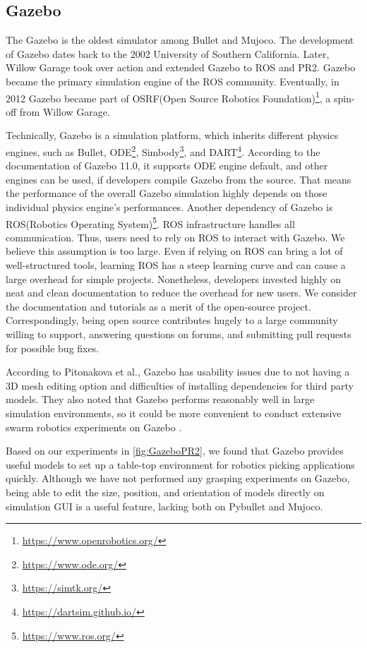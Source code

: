 \subsection{Gazebo}

The Gazebo is the oldest simulator among Bullet and Mujoco. The development of Gazebo dates back to the 2002 University of Southern California. Later, Willow Garage took over action and extended Gazebo to ROS and PR2. Gazebo became the primary simulation engine of the ROS community. Eventually, in 2012 Gazebo became part of OSRF(Open Source Robotics Foundation)\footnote{\url{https://www.openrobotics.org/}}, a spin-off from Willow Garage.

Technically, Gazebo is a simulation platform, which inherits different physics engines, such as Bullet, ODE\footnote{\url{https://www.ode.org/}}, Simbody\footnote{\url{https://simtk.org/}}, and DART\footnote{\url{https://dartsim.github.io/}}. According to the documentation of Gazebo 11.0, it supports ODE engine default, and other engines can be used, if developers compile Gazebo from the source. That means the performance of the overall Gazebo simulation highly depends on those individual physics engine’s performances.  Another dependency of Gazebo is ROS(Robotics Operating System)\footnote{\url{https://www.ros.org/}}. ROS infrastructure handles all communication. Thus, users need to rely on ROS to interact with Gazebo. We believe this assumption is too large. Even if relying on ROS can bring a lot of well-structured tools, learning ROS has a steep learning curve and can cause a large overhead for simple projects.
Nonetheless, developers invested highly on neat and clean documentation to reduce the overhead for new users. We consider the documentation and tutorials as a merit of the open-source project. Correspondingly, being open source contributes hugely to a large community willing to support, answering questions on forums, and submitting pull requests for possible bug fixes. 

According to Pitonakova et al., Gazebo has usability issues due to not having a 3D mesh editing option and difficulties of installing dependencies for third party models. They also noted that Gazebo performs reasonably well in large simulation environments, so it could be more convenient to conduct extensive swarm robotics experiments on Gazebo \cite{Pitonakova2018}.  

Based on our experiments in \ref{fig:GazeboPR2}, we found that Gazebo provides useful models to set up a table-top environment for robotics picking applications quickly. Although we have not performed any grasping experiments on Gazebo, being able to edit the size, position, and orientation of models directly on simulation GUI is a useful feature, lacking both on Pybullet and Mujoco.


